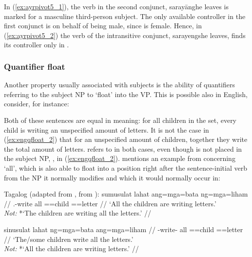 In (\ref{ex:ayrpivot5_1}), the verb in the second conjunct, 
{sarayāng}{he leaves} is marked for a masculine third-person subject. The only
available controller in the first con\-junct is  on behalf of
being male, since  is female. Hence, in
(\ref{ex:ayrpivot5_2}) the verb of the intransitive conjunct, 
{sarayeng}{she leaves}, finds its controller only in .

\subsubsection{Quantifier float}
\label{subsubsec:quantfloat}

Another property usually associated with subjects is the ability of quantifiers
referring to the subject NP to `float' into the VP. This is possible also in
English, consider, for instance:

\pex\label{ex:engqfloat}%
\a\label{ex:engqfloat_1}%
\a\label{ex:engqfloat_2}%
\xe

Both of these sentences are equal in meaning: for all children in the set,
every child is writing an unspecified amount of letters. It is not the case in
(\ref{ex:engqfloat_2}) that for an unspecified amount of children, together
they write the total amount of letters.  refers to  in
both cases, even though  is not placed in the subject NP, , in (\ref{ex:engqfloat_2}). \citet{kroeger1991} mentions an example
from \citet{schachterotanes1972} concerning  `all', which is also
able to float into a position right after the sentence-initial verb from the NP
it normally modifies and which it would normally occur in:

\pex\label{ex:tagqfloat}%
Tagalog (adapted from \cite[22]{kroeger1991}, from 
	\cite[501]{schachterotanes1972}):
\a\label{ex:tagqfloat_1}\begingl
	\gla sumusulat lahat ang=mga=bata ng=mga=liham //
	\glb \Av{}.\Impf{}-write all \Nom{}=\Pl{}=child \Gen{}=\Pl{}=letter //
	\glft `All the children are writing letters.'\\
		\textit{Not:} *`The children are writing all the letters.' //
\endgl

\a\label{ex:tagqfloat_2}\begingl
	\gla sinusulat lahat ng=mga=bata ang=mga=liham //
	\glb \Impf{}-write-\Ov{} all \Gen{}=\Pl{}=child \Nom{}=\Pl{}=letter //
	\glft `The/some children write all the letters.'\\
		\textit{Not:} *`All the children are writing letters.' //
\endgl


